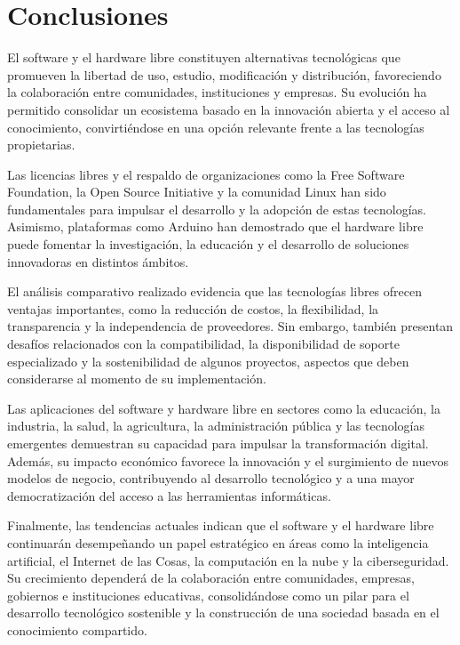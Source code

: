 \documentclass[12pt]{article}
\begin{document}
	\section*{Conclusiones}
	El software y el hardware libre constituyen alternativas tecnológicas que promueven la libertad de uso, estudio, modificación y distribución, favoreciendo la colaboración entre comunidades, instituciones y empresas. Su evolución ha permitido consolidar un ecosistema basado en la innovación abierta y el acceso al conocimiento, convirtiéndose en una opción relevante frente a las tecnologías propietarias.
	
	Las licencias libres y el respaldo de organizaciones como la Free Software Foundation, la Open Source Initiative y la comunidad Linux han sido fundamentales para impulsar el desarrollo y la adopción de estas tecnologías. Asimismo, plataformas como Arduino han demostrado que el hardware libre puede fomentar la investigación, la educación y el desarrollo de soluciones innovadoras en distintos ámbitos.
	
	El análisis comparativo realizado evidencia que las tecnologías libres ofrecen ventajas importantes, como la reducción de costos, la flexibilidad, la transparencia y la independencia de proveedores. Sin embargo, también presentan desafíos relacionados con la compatibilidad, la disponibilidad de soporte especializado y la sostenibilidad de algunos proyectos, aspectos que deben considerarse al momento de su implementación.
	
	Las aplicaciones del software y hardware libre en sectores como la educación, la industria, la salud, la agricultura, la administración pública y las tecnologías emergentes demuestran su capacidad para impulsar la transformación digital. Además, su impacto económico favorece la innovación y el surgimiento de nuevos modelos de negocio, contribuyendo al desarrollo tecnológico y a una mayor democratización del acceso a las herramientas informáticas.
	
	Finalmente, las tendencias actuales indican que el software y el hardware libre continuarán desempeñando un papel estratégico en áreas como la inteligencia artificial, el Internet de las Cosas, la computación en la nube y la ciberseguridad. Su crecimiento dependerá de la colaboración entre comunidades, empresas, gobiernos e instituciones educativas, consolidándose como un pilar para el desarrollo tecnológico sostenible y la construcción de una sociedad basada en el conocimiento compartido.
\end{document}
